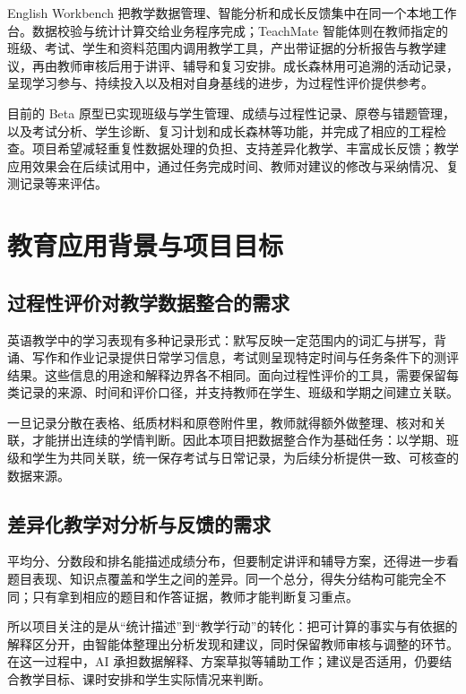 \documentclass[11pt,a4paper,fontset=none]{ctexart}
\begin{document}
English Workbench 把教学数据管理、智能分析和成长反馈集中在同一个本地工作台。数据校验与统计计算交给业务程序完成；TeachMate 智能体则在教师指定的班级、考试、学生和资料范围内调用教学工具，产出带证据的分析报告与教学建议，再由教师审核后用于讲评、辅导和复习安排。成长森林用可追溯的活动记录，呈现学习参与、持续投入以及相对自身基线的进步，为过程性评价提供参考。

目前的 Beta 原型已实现班级与学生管理、成绩与过程性记录、原卷与错题管理，以及考试分析、学生诊断、复习计划和成长森林等功能，并完成了相应的工程检查。项目希望减轻重复性数据处理的负担、支持差异化教学、丰富成长反馈；教学应用效果会在后续试用中，通过任务完成时间、教师对建议的修改与采纳情况、复测记录等来评估。

\section{教育应用背景与项目目标}

\subsection{过程性评价对教学数据整合的需求}

英语教学中的学习表现有多种记录形式：默写反映一定范围内的词汇与拼写，背诵、写作和作业记录提供日常学习信息，考试则呈现特定时间与任务条件下的测评结果。这些信息的用途和解释边界各不相同。面向过程性评价的工具，需要保留每类记录的来源、时间和评价口径，并支持教师在学生、班级和学期之间建立关联。

一旦记录分散在表格、纸质材料和原卷附件里，教师就得额外做整理、核对和关联，才能拼出连续的学情判断。因此本项目把数据整合作为基础任务：以学期、班级和学生为共同关联，统一保存考试与日常记录，为后续分析提供一致、可核查的数据来源。

\subsection{差异化教学对分析与反馈的需求}

平均分、分数段和排名能描述成绩分布，但要制定讲评和辅导方案，还得进一步看题目表现、知识点覆盖和学生之间的差异。同一个总分，得失分结构可能完全不同；只有拿到相应的题目和作答证据，教师才能判断复习重点。

所以项目关注的是从“统计描述”到“教学行动”的转化：把可计算的事实与有依据的解释区分开，由智能体整理出分析发现和建议，同时保留教师审核与调整的环节。在这一过程中，AI 承担数据解释、方案草拟等辅助工作；建议是否适用，仍要结合教学目标、课时安排和学生实际情况来判断。
\end{document}
